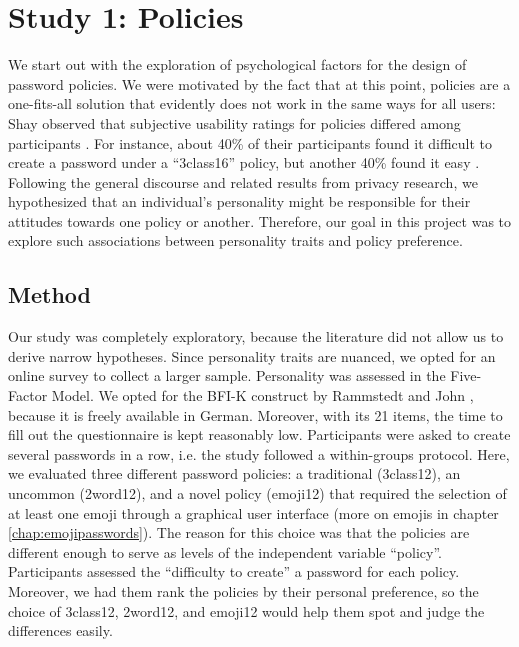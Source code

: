 \section{Study 1: Policies}
We start out with the exploration of psychological factors for the design of password policies. We were motivated by the fact that at this point, policies are a one-fits-all solution that evidently does not work in the same ways for all users: Shay \etal observed that subjective usability ratings for policies differed among participants \cite{Shay2012CorrectHorseBatteryStaple, Shay2014CanLongPasswordsBeSecureAndUsable}. For instance, about 40\% of their participants found it difficult to create a password under a ``3class16'' policy, but another 40\% found it easy \cite{Shay2014CanLongPasswordsBeSecureAndUsable}. Following the general discourse and related results from privacy research, we hypothesized that an individual's personality might be responsible for their attitudes towards one policy or another. Therefore, our goal in this project was to explore such associations between personality traits and policy preference. 
\subsection{Method}
Our study was completely exploratory, because the literature did not allow us to derive narrow hypotheses. Since personality traits are nuanced, we opted for an online survey to collect a larger sample. Personality was assessed in the Five-Factor Model. We opted for the BFI-K construct by Rammstedt and John \cite{Rammstedt2005BFI}, because it is freely available in German. Moreover, with its 21 items, the time to fill out the questionnaire is kept reasonably low. 
Participants were asked to create several passwords in a row, i.e. the study followed a within-groups protocol. Here, we evaluated three different password policies: a traditional (3class12), an uncommon (2word12), and a novel policy (emoji12) that required the selection of at least one emoji through a graphical user interface (more on emojis in chapter \ref{chap:emojipasswords}). The reason for this choice was that the policies are different enough to serve as levels of the independent variable ``policy''. Participants assessed the ``difficulty to create'' a password for each policy. Moreover, we had them rank the policies by their personal preference, so the choice of 3class12, 2word12, and emoji12 would help them spot and judge the differences easily. 

